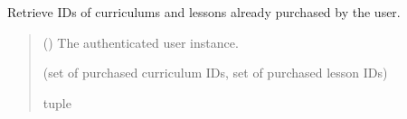 \documentclass[letterpaper,10pt,english]{sphinxmanual}
\begin{document}

\begin{fulllineitems}
\label{\detokenize{cart:cart.views.get_purchased_items}}
\pysigstartsignatures
\pysiglinewithargsret
{}
{}
{}
\pysigstopsignatures
\sphinxAtStartPar
Retrieve IDs of curriculums and lessons already purchased by the user.
\begin{quote}\begin{description}
\sphinxAtStartPar
{} () \textendash{} The authenticated user instance.

\sphinxAtStartPar
(set of purchased curriculum IDs, set of purchased lesson IDs)

\sphinxAtStartPar
tuple

\end{description}\end{quote}

\end{fulllineitems}

\end{document}
